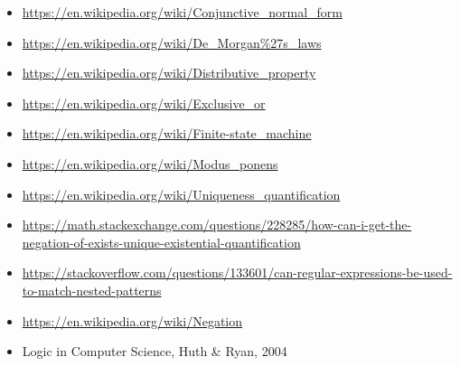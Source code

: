 \documentclass[a4paper, 14pt]{report}
\begin{document}
\begin{flushleft}
	\begin{itemize}[noitemsep]
		\item \url{https://en.wikipedia.org/wiki/Conjunctive_normal_form}
		\item \url{https://en.wikipedia.org/wiki/De_Morgan\%27s_laws}
		\item \url{https://en.wikipedia.org/wiki/Distributive_property}
		\item \url{https://en.wikipedia.org/wiki/Exclusive_or}
		\item \url{https://en.wikipedia.org/wiki/Finite-state_machine}
		\item \url{https://en.wikipedia.org/wiki/Modus_ponens}
		\item \url{https://en.wikipedia.org/wiki/Uniqueness_quantification}
		\item \url{https://math.stackexchange.com/questions/228285/how-can-i-get-the-negation-of-exists-unique-existential-quantification}
		\item \url{https://stackoverflow.com/questions/133601/can-regular-expressions-be-used-to-match-nested-patterns}
		\item \url{https://en.wikipedia.org/wiki/Negation}
		\item Logic in Computer Science, Huth \& Ryan, 2004
	\end{itemize}		
\end{flushleft}
\end{document}
